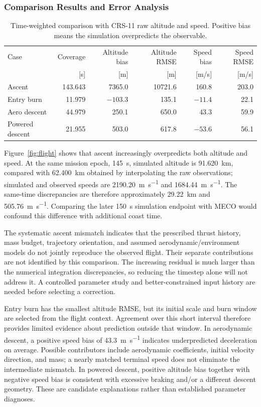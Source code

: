 \documentclass[11pt,letterpaper]{article}
\begin{document}
\subsubsection{Comparison Results and Error Analysis}
\begin{table}[!htbp]
\centering\small
\caption{Time-weighted comparison with CRS-11 raw altitude and speed. Positive bias means the simulation overpredicts the observable.}\label{tab:comparison}
\begin{tabularx}{\textwidth}{Yrrrrr}\toprule
Case & Coverage & Altitude bias & Altitude RMSE & Speed bias & Speed RMSE\\
 & [s] & [m] & [m] & [m/s] & [m/s]\\\midrule
Ascent & 143.643 & 7365.0 & 10721.6 & 160.8 & 203.0\\
Entry burn & 11.979 & $-103.3$ & 135.1 & $-11.4$ & 22.1\\
Aero descent & 44.979 & 250.1 & 650.0 & 43.3 & 59.9\\
Powered descent & 21.955 & 503.0 & 617.8 & $-53.6$ & 56.1\\\bottomrule
\end{tabularx}
\end{table}

Figure~\ref{fig:flight} shows that ascent increasingly overpredicts both altitude and speed. At the same mission epoch, \SI{145}{\second}, simulated altitude is \SI{91.620}{\kilo\metre}, compared with \SI{62.400}{\kilo\metre} obtained by interpolating the raw observations; simulated and observed speeds are \SI{2190.20}{\metre\per\second} and \SI{1684.44}{\metre\per\second}. The same-time discrepancies are therefore approximately \SI{29.22}{\kilo\metre} and \SI{505.76}{\metre\per\second}. Comparing the later \SI{150}{\second} simulation endpoint with MECO would confound this difference with additional coast time.

The systematic ascent mismatch indicates that the prescribed thrust history, mass budget, trajectory orientation, and assumed aerodynamic/environment models do not jointly reproduce the observed flight. Their separate contributions are not identified by this comparison. The increasing residual is much larger than the numerical integration discrepancies, so reducing the timestep alone will not address it. A controlled parameter study and better-constrained input history are needed before selecting a correction.

Entry burn has the smallest altitude RMSE, but its initial scale and burn window are selected from the flight context. Agreement over this short interval therefore provides limited evidence about prediction outside that window. In aerodynamic descent, a positive speed bias of \SI{43.3}{\metre\per\second} indicates underpredicted deceleration on average. Possible contributors include aerodynamic coefficients, initial velocity direction, and mass; a nearly matched terminal speed does not eliminate the intermediate mismatch. In powered descent, positive altitude bias together with negative speed bias is consistent with excessive braking and/or a different descent geometry. These are candidate explanations rather than established parameter diagnoses.
\end{document}
